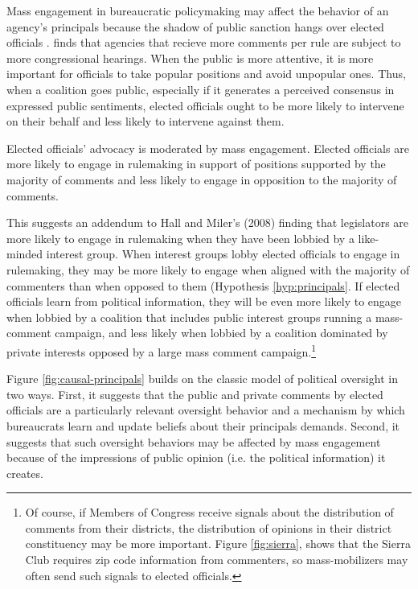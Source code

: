 Mass engagement in bureaucratic policymaking may affect the behavior of an agency's principals because the shadow of public sanction hangs over elected officials \citep{Arnold1979, Mayhew2000}. \citet{Moore2018} finds that agencies that recieve more comments per rule are subject to more congressional hearings. When the public is more attentive, it is more important for officials to take popular positions and avoid unpopular ones.
Thus, when a coalition goes public, especially if it generates a perceived consensus in expressed public sentiments, elected officials ought to be more likely to intervene on their behalf and less likely to intervene against them.  

\begin{hyp} \label{hyp:principals}
Elected officials' advocacy is moderated by mass engagement. Elected officials are more likely to engage in rulemaking in support of positions supported by the majority of comments and less likely to engage in opposition to the majority of comments.
\end{hyp}

This suggests an addendum to Hall and Miler's (2008) finding that legislators are more likely to engage in rulemaking when they have been lobbied by a like-minded interest group.
When interest groups lobby elected officials to engage in rulemaking, they may be more likely to engage when aligned with the majority of commenters than when opposed to them (Hypothesis \ref{hyp:principals}.
If elected officials learn from political information, they will be even more likely to engage when lobbied by a coalition that includes public interest groups running a mass-comment campaign, and less likely when lobbied by a coalition dominated by private interests opposed by a large mass comment campaign.\footnote{Of course, if Members of Congress receive signals about the distribution of comments from their districts, the distribution of opinions in their district constituency may be more important. Figure \ref{fig:sierra}, shows that the Sierra Club requires zip code information from commenters, so mass-mobilizers may often send such signals to elected officials.}



Figure \ref{fig:causal-principals} builds on the classic model of political oversight in two ways. First, it suggests that the public and private comments by elected officials are a particularly relevant oversight behavior and a mechanism by which bureaucrats learn and update beliefs about their principals demands. Second, it suggests that such oversight behaviors may be affected by mass engagement because of the impressions of public opinion (i.e. the political information) it creates.